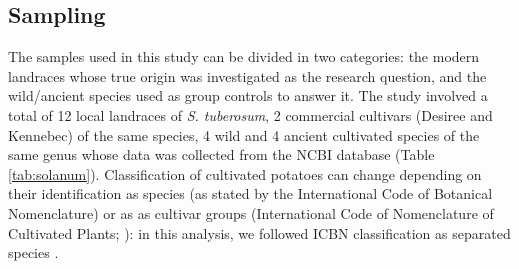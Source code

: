 \documentclass[a4paper, 12pt]{report}
\begin{document}
\subsection{Sampling}
The samples used in this study can be divided in two categories: the modern landraces whose true origin was investigated as the research question, and the wild/ancient species used as group controls to answer it. The study involved a total of 12 local landraces of \textit{S. tuberosum}, 2 commercial cultivars (Desiree and Kennebec) of the same species, 4 wild and 4 ancient cultivated species of the same genus whose data was collected from the NCBI database (Table \ref{tab:solanum}). Classification of cultivated potatoes can change depending on their identification as species (as stated by the International Code of Botanical Nomenclature) or as as cultivar groups (International Code of Nomenclature of Cultivated Plants; \cite{huamanReclassificationLandracePopulations2002}): in this analysis, we followed ICBN classification as separated species \parencite{turlandInternationalCodeNomenclature2018}. 
\end{document}
